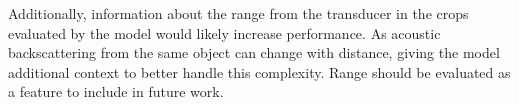     Additionally, information about the range from the transducer in the crops evaluated by the model would likely increase performance. As acoustic backscattering from the same object can change with distance, giving the model additional context to better handle this complexity. Range should be evaluated as a feature to include in future work. 

    
%    
%    
%    
%    
%
%     
%
